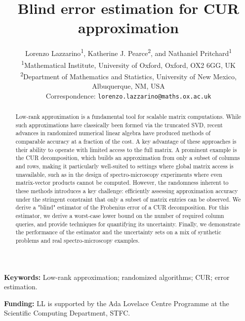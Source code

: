 \documentclass[11pt]{article}
\begin{document}
\title{Blind error estimation for CUR approximation}
\author{
    Lorenzo Lazzarino\textsuperscript{1}, Katherine J. Pearce\textsuperscript{2}, and Nathaniel Pritchard\textsuperscript{1}\\
    \small \textsuperscript{1}Mathematical Institute, University of Oxford, Oxford, OX2 6GG, UK\\
    \small \textsuperscript{2}Department of Mathematics and Statistics, University of New Mexico, Albuquerque, NM, USA\\
    \small Correspondence: \texttt{lorenzo.lazzarino@maths.ox.ac.uk}
}
\date{}
\maketitle
\frenchspacing

\begin{abstract}
    Low-rank approximation is a fundamental tool for scalable matrix computations. While such approximations have classically been formed via the truncated SVD, recent advances in randomized numerical linear algebra have produced methods of comparable accuracy at a fraction of the cost. A key advantage of these approaches is their ability to operate with limited access to the full matrix. A prominent example is the CUR decomposition, which builds an approximation from only a subset of columns and rows, making it particularly well-suited to settings where global matrix access is unavailable, such as in the design of spectro-microscopy experiments where even matrix-vector products cannot be computed.
    However, the randomness inherent to these methods introduces a key challenge: efficiently assessing approximation accuracy under the stringent constraint that only a subset of matrix entries can be observed. We derive a "blind" estimator of the Frobenius error of a CUR decomposition. For this estimator, we derive a worst-case lower bound on the number of required column queries, and provide techniques for quantifying its uncertainty. Finally, we demonstrate the performance of the estimator and the uncertainty sets on a mix of synthetic problems and real spectro-microscopy examples.
\end{abstract}

\noindent\textbf{Keywords:} Low-rank approximation; randomized algorithms; CUR; error estimation.

\noindent\textbf{Funding:} LL is supported by the Ada Lovelace Centre Programme at the Scientific Computing Department, STFC.
\end{document}
